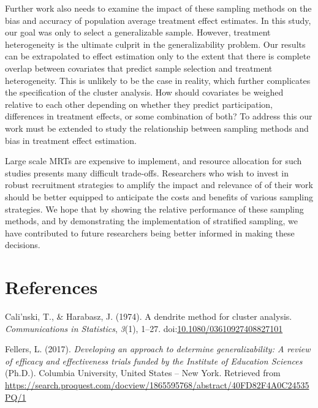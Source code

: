 \documentclass[man,floatsintext]{apa6}
\begin{document}
Further work also needs to examine the impact of these sampling methods on the bias and accuracy of population average treatment effect estimates. In this study, our goal was only to select a generalizable sample. However, treatment heterogeneity is the ultimate culprit in the generalizability problem. Our results can be extrapolated to effect estimation only to the extent that there is complete overlap between covariates that predict sample selection and treatment heterogeneity. This is unlikely to be the case in reality, which further complicates the specification of the cluster analysis. How should covariates be weighed relative to each other depending on whether they predict participation, differences in treatment effects, or some combination of both? To address this our work must be extended to study the relationship between sampling methods and bias in treatment effect estimation.

Large scale MRTs are expensive to implement, and resource allocation for such studies presents many difficult trade-offs. Researchers who wish to invest in robust recruitment strategies to amplify the impact and relevance of of their work should be better equipped to anticipate the costs and benefits of various sampling strategies. We hope that by showing the relative performance of these sampling methods, and by demonstrating the implementation of stratified sampling, we have contributed to future researchers being better informed in making these decisions.

\newpage

\hypertarget{references}{%
\section{References}\label{references}}

\begingroup
\setlength{\parindent}{-0.5in}
\setlength{\leftskip}{0.5in}

\hypertarget{refs}{}
\leavevmode\hypertarget{ref-calinskiDendriteMethodCluster1974}{}%
Cali\a'nski, T., \& Harabasz, J. (1974). A dendrite method for cluster analysis. \emph{Communications in Statistics}, \emph{3}(1), 1--27. doi:\href{https://doi.org/10.1080/03610927408827101}{10.1080/03610927408827101}

\leavevmode\hypertarget{ref-fellersDevelopingApproachDetermine2017}{}%
Fellers, L. (2017). \emph{Developing an approach to determine generalizability: A review of efficacy and effectiveness trials funded by the Institute of Education Sciences} (Ph.D.). Columbia University, United States -- New York. Retrieved from \url{https://search.proquest.com/docview/1865595768/abstract/40FD82F4A0C24535PQ/1}
\end{document}
